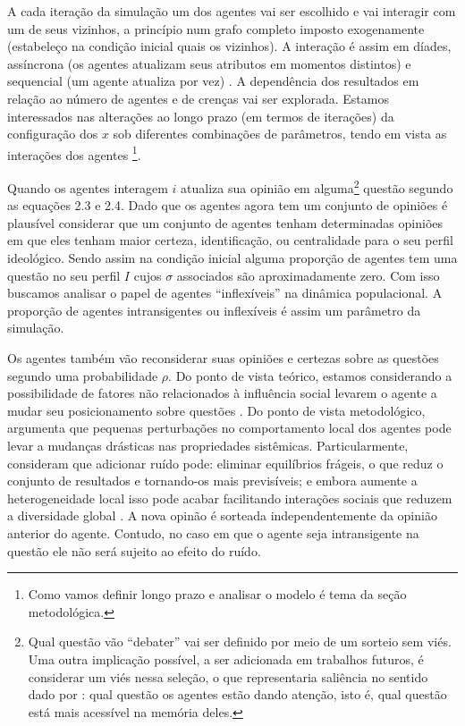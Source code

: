 A cada iteração da simulação um dos agentes vai ser escolhido e vai interagir
com um de seus vizinhos, a princípio num grafo completo imposto exogenamente
(estabeleço na condição inicial quais os vizinhos). A interação é assim em
díades, assíncrona (os agentes atualizam seus atributos em momentos distintos) e
sequencial (um agente atualiza por vez) \cite{wilensky2015introduction}. A
dependência dos resultados em relação ao número de agentes e de crenças vai ser
explorada. Estamos interessados nas alterações ao longo prazo (em termos de
iterações) da configuração dos \(x\) sob diferentes combinações de parâmetros,
tendo em vista as interações dos agentes \cite{acemoglu2011opinion}
\footnote{Como vamos definir longo prazo e analisar o modelo é tema da seção
  metodológica.}.

Quando os agentes interagem \(i\) atualiza sua opinião em alguma\footnote{Qual
  questão vão ``debater'' vai ser definido por meio de um sorteio sem viés. Uma
  outra implicação possível, a ser adicionada em trabalhos futuros, é considerar
  um viés nessa seleção, o que representaria saliência no sentido dado por
  : qual questão os agentes estão dando atenção,
  isto é, qual questão está mais acessível na memória deles.} questão segundo as
equações 2.3 e 2.4. Dado que os agentes agora tem um conjunto de opiniões é
plausível considerar que um conjunto de agentes tenham determinadas opiniões em
que eles tenham maior certeza, identificação, ou centralidade para o seu perfil
ideológico. Sendo assim na condição inicial alguma proporção de agentes tem uma
questão no seu perfil \(I\) cujos \(\sigma\) associados são aproximadamente zero. Com
isso buscamos analisar o papel de agentes ``inflexíveis'' na dinâmica
populacional. A proporção de agentes intransigentes ou inflexíveis é assim um
parâmetro da simulação.

Os agentes também vão reconsiderar suas opiniões e certezas sobre as questões
segundo uma probabilidade \(\rho\). Do ponto de vista teórico, estamos considerando
a possibilidade de fatores não relacionados à influência social levarem o agente
a mudar seu posicionamento sobre questões \cite{flache2017, lorenz2017modeling}.
Do ponto de vista metodológico,  argumenta que
pequenas perturbações no comportamento local dos agentes pode levar a mudanças
drásticas nas propriedades sistêmicas. Particularmente, consideram que adicionar
ruído pode: eliminar equilíbrios frágeis, o que reduz o conjunto de resultados e
tornando-os mais previsíveis; e embora aumente a heterogeneidade local isso pode
acabar facilitando interações sociais que reduzem a diversidade global
\cite[p.323]{macy2015signal}. A nova opinão é sorteada independentemente da
opinião anterior do agente. Contudo, no caso em que o agente seja intransigente
na questão ele não será sujeito ao efeito do ruído.


